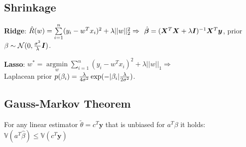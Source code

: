 \subsection*{Shrinkage}
\textbf{Ridge}:
$\hat{R}(w) = \sum \limits_{i=1}^n (y_i - w^Tx_i)^2 + \lambda ||w||_2^2 \Rightarrow\\$
$\hat{\boldsymbol{\beta}} = (\boldsymbol{X}^T\boldsymbol{X} + \lambda \boldsymbol{I})^{-1}\boldsymbol{X}^T \boldsymbol{y}$,
prior $\beta \sim \mathcal{N}(0, \frac{\sigma^2}{\lambda} \boldsymbol{I})$.

\textbf{Lasso}:
$w^* = \underset{w}{\operatorname{argmin}} \sum \limits_{i=1}^n (y_i - w^Tx_i)^2 + \lambda ||w||_1 \Rightarrow$\\
Laplacean prior $p(\beta_i) = \frac{\lambda}{4\sigma^2} \exp(-\lvert\beta_i\rvert \frac{\lambda}{2\sigma^2})$.


\subsection*{Gauss-Markov Theorem}
For any linear estimator $\widetilde{\theta}=c^T\mathbf{y}$ that is unbiased for $a^T\beta$ it holds: $\mathbb{V}(a^T\hat{\beta}) \leq \mathbb{V}(c^T\mathbf{y})$\\




